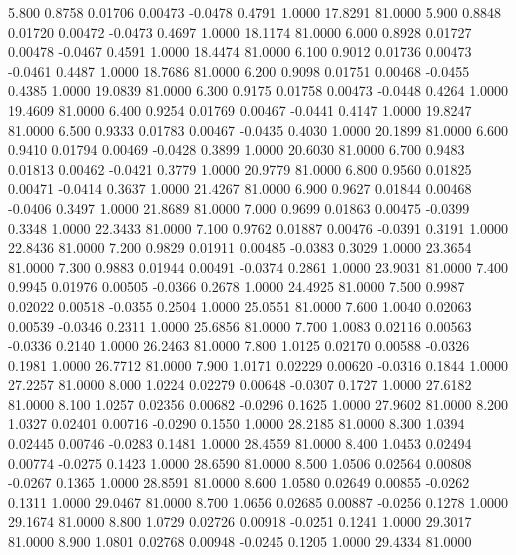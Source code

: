    5.800   0.8758   0.01706   0.00473  -0.0478   0.4791   1.0000  17.8291  81.0000
   5.900   0.8848   0.01720   0.00472  -0.0473   0.4697   1.0000  18.1174  81.0000
   6.000   0.8928   0.01727   0.00478  -0.0467   0.4591   1.0000  18.4474  81.0000
   6.100   0.9012   0.01736   0.00473  -0.0461   0.4487   1.0000  18.7686  81.0000
   6.200   0.9098   0.01751   0.00468  -0.0455   0.4385   1.0000  19.0839  81.0000
   6.300   0.9175   0.01758   0.00473  -0.0448   0.4264   1.0000  19.4609  81.0000
   6.400   0.9254   0.01769   0.00467  -0.0441   0.4147   1.0000  19.8247  81.0000
   6.500   0.9333   0.01783   0.00467  -0.0435   0.4030   1.0000  20.1899  81.0000
   6.600   0.9410   0.01794   0.00469  -0.0428   0.3899   1.0000  20.6030  81.0000
   6.700   0.9483   0.01813   0.00462  -0.0421   0.3779   1.0000  20.9779  81.0000
   6.800   0.9560   0.01825   0.00471  -0.0414   0.3637   1.0000  21.4267  81.0000
   6.900   0.9627   0.01844   0.00468  -0.0406   0.3497   1.0000  21.8689  81.0000
   7.000   0.9699   0.01863   0.00475  -0.0399   0.3348   1.0000  22.3433  81.0000
   7.100   0.9762   0.01887   0.00476  -0.0391   0.3191   1.0000  22.8436  81.0000
   7.200   0.9829   0.01911   0.00485  -0.0383   0.3029   1.0000  23.3654  81.0000
   7.300   0.9883   0.01944   0.00491  -0.0374   0.2861   1.0000  23.9031  81.0000
   7.400   0.9945   0.01976   0.00505  -0.0366   0.2678   1.0000  24.4925  81.0000
   7.500   0.9987   0.02022   0.00518  -0.0355   0.2504   1.0000  25.0551  81.0000
   7.600   1.0040   0.02063   0.00539  -0.0346   0.2311   1.0000  25.6856  81.0000
   7.700   1.0083   0.02116   0.00563  -0.0336   0.2140   1.0000  26.2463  81.0000
   7.800   1.0125   0.02170   0.00588  -0.0326   0.1981   1.0000  26.7712  81.0000
   7.900   1.0171   0.02229   0.00620  -0.0316   0.1844   1.0000  27.2257  81.0000
   8.000   1.0224   0.02279   0.00648  -0.0307   0.1727   1.0000  27.6182  81.0000
   8.100   1.0257   0.02356   0.00682  -0.0296   0.1625   1.0000  27.9602  81.0000
   8.200   1.0327   0.02401   0.00716  -0.0290   0.1550   1.0000  28.2185  81.0000
   8.300   1.0394   0.02445   0.00746  -0.0283   0.1481   1.0000  28.4559  81.0000
   8.400   1.0453   0.02494   0.00774  -0.0275   0.1423   1.0000  28.6590  81.0000
   8.500   1.0506   0.02564   0.00808  -0.0267   0.1365   1.0000  28.8591  81.0000
   8.600   1.0580   0.02649   0.00855  -0.0262   0.1311   1.0000  29.0467  81.0000
   8.700   1.0656   0.02685   0.00887  -0.0256   0.1278   1.0000  29.1674  81.0000
   8.800   1.0729   0.02726   0.00918  -0.0251   0.1241   1.0000  29.3017  81.0000
   8.900   1.0801   0.02768   0.00948  -0.0245   0.1205   1.0000  29.4334  81.0000
